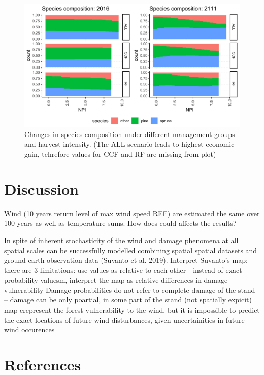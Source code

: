 \documentclass[]{elsarticle} %
\makeatletter
\def\maxwidth{\ifdim\Gin@nat@width>\linewidth\linewidth
\else\Gin@nat@width\fi}
\let\Oldincludegraphics\includegraphics
\renewcommand{\includegraphics}[1]{\Oldincludegraphics[width=\maxwidth]{#1}}
\makeatother
\begin{document}
\begin{figure}
\centering
\includegraphics{test_manus_files/figure-latex/species_change-1.pdf}
\caption{Changes in species composition under different management
groups and harvest intensity. (The ALL scenario leads to highest
economic gain, tehrefore values for CCF and RF are missing from plot)}
\end{figure}

\section{Discussion}\label{discussion}

Wind (10 years return level of max wind speed REF) are estimated the
same over 100 years as well as temperature sums. How does could affects
the results?

In spite of inherent stochasticity of the wind and damage phenomena at
all spatial scales can be successfully modelled combining spatial
spatial datasets and ground earth observation data (Suvanto et al.
2019). Interpret Suvanto's map: there are 3 limitations: use values as
relative to each other - instead of exact probability valuesm, interpret
the map as relative differences in damage vulnerability Damage
probabilities do not refer to complete damage of the stand -- damage can
be only poartial, in some part of the stand (not spatially expicit) map
erepresent the forest vulnerability to the wind, but it is impossible to
predict the exact locations of future wind disturbances, given
uncertainities in future wind occurences

\section*{References}\label{references}
\end{document}
